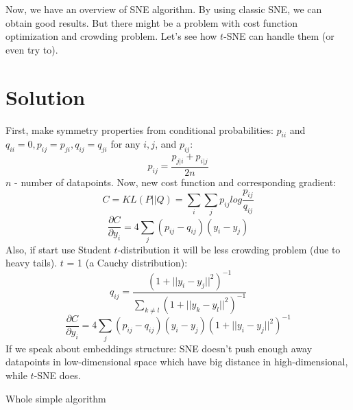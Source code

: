 Now, we have an overview of SNE algorithm. By using classic SNE, we can obtain good results. But there might be a problem with cost function optimization and crowding problem. Let's see how $t$-SNE can handle them (or even try to).

\section{Solution}

First, make symmetry properties from conditional probabilities: $p_{ii}$ and $q_{ii} = 0, p_{ij} = p_{ji}, q_{ij} = q_{ji}$ for any $i, j$, and $p_{ij}$:
$$ p_{ij} = \frac{p_{j|i} + p_{i|j}}{2n} $$
$n$ - number of datapoints. Now, new cost function and corresponding gradient:
$$ C = KL(P||Q) = \sum_i{\sum_j{p_{ij}log{\frac{p_{ij}}{q_{ij}}}}} $$
$$ \frac{\partial C}{\partial y_i} = 4 \sum_j{(p_{ij} - q_{ij})(y_i - y_j)} $$
Also, if start use Student $t$-distribution it will be less crowding problem (due to heavy tails). $t$ = 1 (a Cauchy distribution):
\begin{equation}
    q_{ij} = \frac{(1 + ||y_i - y_j||^2)^{-1}}{\sum_{k \ne l}{(1 + ||y_k - y_l||^2)^{-1}}}
\end{equation}
\begin{equation}
    \frac{\partial C}{\partial y_i} = 4 \sum_j{(p_{ij} - q_{ij})(y_i - y_j)(1 + ||y_i - y_j||^2)^{-1}}
\end{equation}
If we speak about embeddings structure: SNE doesn't push enough away datapoints in low-dimensional space which have big distance in high-dimensional, while $t$-SNE does.\\

\begin{algorithm}[H] %
\caption{Whole simple algorithm \cite{tsnearticle}}
\SetAlgoLined
{}
\end{algorithm}

